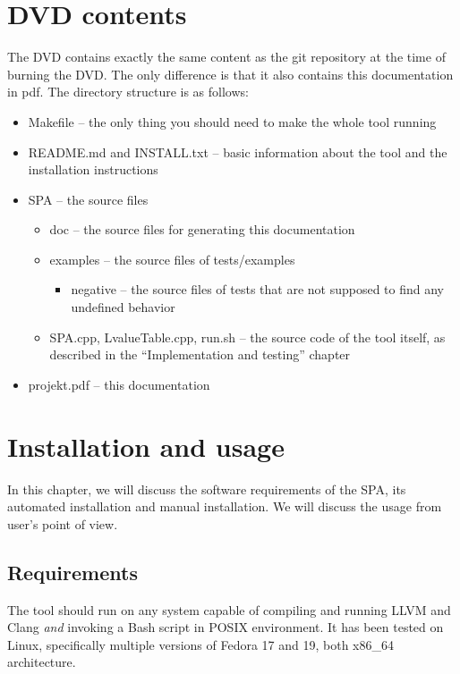 \chapter{DVD contents}
The DVD contains exactly the same content as the git repository at the time of burning the DVD. The only difference is that it also contains this documentation in pdf. The directory structure is as follows:

\begin{itemize}
\item Makefile -- the only thing you should need to make the whole tool running
\item README.md and INSTALL.txt -- basic information about the tool and the installation instructions
\item SPA -- the source files
  \begin{itemize}
  \item doc -- the source files for generating this documentation
  \item examples -- the source files of tests/examples
    \begin{itemize}
      \item negative -- the source files of tests that are not supposed to find any undefined behavior
    \end{itemize}
  \item SPA.cpp, LvalueTable.cpp, run.sh -- the source code of the tool itself, as described in the ``Implementation and testing'' chapter
  \end{itemize}
\item projekt.pdf -- this documentation
\end{itemize}

\chapter{Installation and usage}
In this chapter, we will discuss the software requirements of the SPA, its automated installation and manual installation. We will discuss the usage from user's point of view.%
\section{Requirements}
The tool should run on any system capable of compiling and running LLVM and Clang \emph{and} invoking a Bash script in POSIX environment. It has been tested on Linux, specifically multiple versions of Fedora 17 and 19, both x86\_64 architecture.

